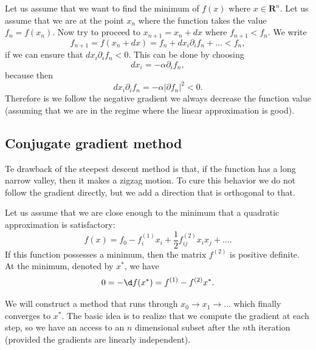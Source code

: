 \documentclass[10pt,a4paper]{article}
\begin{document}
Let us assume that we want to find the minimum of $f(x)$ where $x\in\textbf{R}^n$. Let us assume that we are at the point $x_n$ where the function takes the value $f_n=f(x_n)$. Now try to proceed to $x_{n+1}=x_n+dx$ where $f_{n+1}<f_n$. We write
\begin{equation}
f_{n+1}=f(x_n+dx) = f_n + dx_i \partial_i f_n + \dots < f_n,
\end{equation}
if we can ensure that $dx_i \partial_i f_n<0$. This can be done by choosing\begin{equation}
dx_i =-\alpha \partial_i f_n,
\end{equation}
because then
\begin{equation}
dx_i \partial_i f_n = -\alpha |\partial f_n|^2 <0.
\end{equation}
Therefore is we follow the negative gradient we always decrease the function value (assuming that we are in the regime where the linear approximation is good).

\subsection{Conjugate gradient method}

Te drawback of the steepest descent method is that, if the function has a long narrow valley, then it makes a zigzag motion. To cure this behavior we do not follow the gradient directly, but we add a direction that is orthogonal to that.

Let us assume that we are close enough to the minimum that a quadratic approximation is satisfactory:\begin{equation}
f(x) = f_0 - f^{(1)}_i x_i + \dfrac{1}{2} f^{(2)}_{ij} x_ix_j+\dots.
\end{equation}
If this function possesses a minimum, then the matrix $f^{(2)}$ is positive definite. At the minimum, denoted by $x^*$, we have
\begin{equation}
0=-\d f(x^*)=f^{(1)}- f^{(2)} x^*.
\end{equation}

We will construct a method that runs through $x_0\to x_1\to\dots $ which finally converges to $x^*$. The basic idea is to realize that we compute the gradient at each step, so we have an access to an $n$ dimensional subset after the $n$th iteration (provided the gradients are linearly independent).
\end{document}

